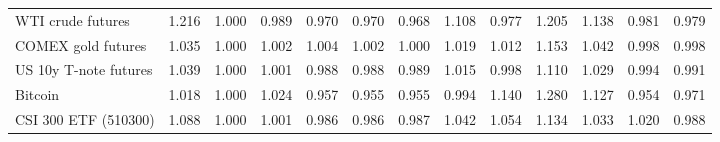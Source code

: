 \begin{table}[!htbp]
\begin{adjustbox}{max width=\textwidth}
\begin{tabular}{lrrrrrrrrrrrr}
WTI crude futures & 1.216 & 1.000 & 0.989 & 0.970 & 0.970 & 0.968 & 1.108 & 0.977 & 1.205 & 1.138 & 0.981 & 0.979\\
COMEX gold futures & 1.035 & 1.000 & 1.002 & 1.004 & 1.002 & 1.000 & 1.019 & 1.012 & 1.153 & 1.042 & 0.998 & 0.998\\
US 10y T-note futures & 1.039 & 1.000 & 1.001 & 0.988 & 0.988 & 0.989 & 1.015 & 0.998 & 1.110 & 1.029 & 0.994 & 0.991\\
Bitcoin & 1.018 & 1.000 & 1.024 & 0.957 & 0.955 & 0.955 & 0.994 & 1.140 & 1.280 & 1.127 & 0.954 & 0.971\\
CSI 300 ETF (510300) & 1.088 & 1.000 & 1.001 & 0.986 & 0.986 & 0.987 & 1.042 & 1.054 & 1.134 & 1.033 & 1.020 & 0.988\\
\bottomrule
\end{tabular}
\end{adjustbox}
\end{table}